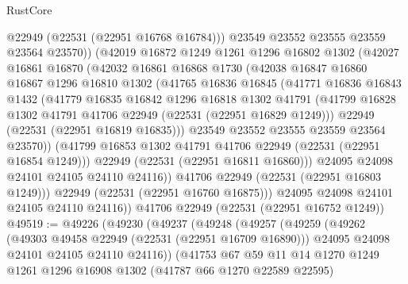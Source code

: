 \begin{lexlean}{RustCore}
\begin{coremodule}
                @22949
                (@22531 (@22951 @16768 @16784)))
              @23549
              @23552
              @23555
              @23559
              @23564
              @23570))
          (@42019
            @16872
            @1249
            @1261
            @1296
            @16802
            @1302
            (@42027
              @16861
              @16870
              (@42032
                @16861
                @16868
                @1730
                (@42038
                  @16847
                  @16860
                  @16867
                  @1296
                  @16810
                  @1302
                  (@41765
                    @16836
                    @16845
                    (@41771
                      @16836
                      @16843
                      @1432
                      (@41779
                        @16835
                        @16842
                        @1296
                        @16818
                        @1302
                        @41791
                        (@41799 @16828 @1302 @41791 @41706 @22949 (@22531 (@22951 @16829 @1249)))
                        @22949
                        (@22531 (@22951 @16819 @16835)))
                      @23549
                      @23552
                      @23555
                      @23559
                      @23564
                      @23570))
                  (@41799 @16853 @1302 @41791 @41706 @22949 (@22531 (@22951 @16854 @1249)))
                  @22949
                  (@22531 (@22951 @16811 @16860)))
                @24095
                @24098
                @24101
                @24105
                @24110
                @24116))
            @41706
            @22949
            (@22531 (@22951 @16803 @1249)))
          @22949
          (@22531 (@22951 @16760 @16875)))
        @24095
        @24098
        @24101
        @24105
        @24110
        @24116))
    @41706
    @22949
    (@22531 (@22951 @16752 @1249))
@49519 := @49226
    (@49230
      (@49237
        (@49248
          (@49257
            (@49259
              (@49262
                (@49303 @49458 @22949 (@22531 (@22951 @16709 @16890)))
                @24095
                @24098
                @24101
                @24105
                @24110
                @24116))
            (@41753
              @67
              @59
              @11
              @14
              @1270
              @1249
              @1261
              @1296
              @16908
              @1302
              (@41787 @66 @1270 @22589 @22595)

\end{coremodule}
\end{lexlean}
